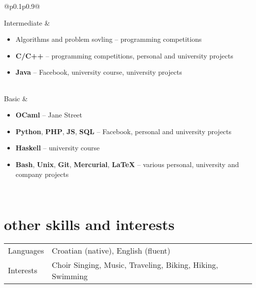 \documentclass[a4paper]{article}
\makeatletter
\newlength{\tablewidth}
\newenvironment{skills}{%
\setlength{\tablewidth}{\linewidth}
\addtolength{\tablewidth}{-2\tabcolsep}
\setlength{\extrarowheight}{0.2em}
\begin{tabular}{@{}p{0.1\tablewidth}p{0.9\tablewidth}@{}}
}{%
\end{tabular}
}
\makeatother
\begin{document}
\begin{skills}
  Intermediate &
  \begin{itemize}
    \item Algorithms and problem sovling -- programming competitions
    \item \textbf{C/C++} -- programming competitions, personal and university projects
    \item \textbf{Java} -- Facebook, university course, university projects
  \end{itemize} \\
  Basic &
  \begin{itemize}
    \item \textbf{OCaml} -- Jane Street
    \item \textbf{Python}, \textbf{PHP}, \textbf{JS}, \textbf{SQL} -- Facebook, personal and university projects
    \item \textbf{Haskell} -- university course
    \item \textbf{Bash}, \textbf{Unix}, \textbf{Git}, \textbf{Mercurial}, \textbf{LaTeX} -- various personal, university and company projects
  \end{itemize} \\
\end{skills}

\section{other skills and interests}

\begin{skills}
  Languages & 
    Croatian (native), English (fluent) \\ 
  Interests & 
    Choir Singing, Music, Traveling, Biking, Hiking, Swimming \\ 
\end{skills}
\end{document}
